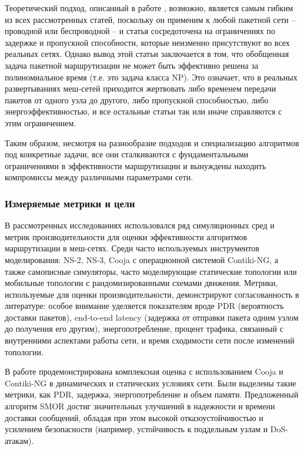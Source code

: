 \documentclass[%
]{report}
\begin{document}
Теоретический подход, описанный в работе
\textcite{DIIANNI1998131}, возможно, является самым гибким
из всех рассмотренных статей, поскольку он применим к
любой пакетной сети -- проводной или беспроводной -- и
статья сосредоточена на ограничениях по задержке
и пропускной способности, которые неизменно
присутствуют во всех реальных сетях.
Однако вывод этой статьи заключается в том,
что обобщенная задача пакетной маршрутизации не может быть
эффективно решена за полиномиальное время
(т.е. это задача класса NP).
Это означает, что в реальных развертываниях меш-сетей
приходится жертвовать либо временем передачи
пакетов от одного узла до другого,
либо пропускной способностью,
либо энергоэффективностью,
и все остальные статьи так или иначе справляются
с этим ограничением.

Таким образом, несмотря на разнообразие подходов
и специализацию алгоритмов под конкретные задачи,
все они сталкиваются с фундаментальными ограничениями
в эффективности маршрутизации и вынуждены находить
компромиссы между различными параметрами сети.

\subsubsection{Измеряемые метрики и цели}\label{evaluation-metrics-and-targets}


В рассмотренных исследованиях использовался
ряд симуляционных сред и метрик производительности
для оценки эффективности алгоритмов маршрутизации в меш-сетях.
Среди часто используемых инструментов моделирования:
NS-2, NS-3, Cooja с операционной системой Contiki-NG,
а также самописные симуляторы,
часто моделирующие статические топологии или
мобильные топологии с рандомизированными схемами движения.
Метрики, используемые для оценки производительности,
демонстрируют согласованность в литературе:
особое внимание уделяется показателям вроде
PDR (вероятность доставки пакетов),
end-to-end latency (задержка от отправки пакета одним узлом до получения его другим),
энергопотребление,
процент трафика, связанный с внутренними аспектами работы сети,
и время сходимости сети после изменений топологии.

В работе \textcite{KRENTZ202457} продемонстрирована
комплексная оценка с использованием
Cooja и Contiki-NG в динамических и статических условиях сети.
Были выделены такие метрики, как PDR,
задержка, энергопотребление и объем памяти.
Предложенный алгоритм SMOR достиг значительных
улучшений в надежности и времени доставки сообщений,
обладая при этом высокой отказоустойчивостью и усилением
безопасности (например, устойчивость
к поддельным узлам и DoS-атакам).
\end{document}
